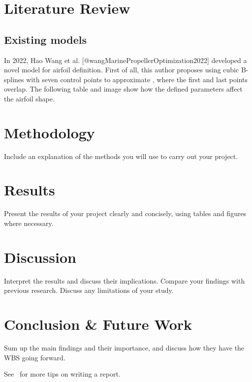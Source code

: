 \documentclass[11pt,twoside,a4paper]{report}
\begin{document}
\chapter{Literature Review}
\section{Existing models}
In 2022, Hao Wang et al. [@wangMarinePropellerOptimization2022] developed a novel model for airfoil definition. First of all, this author proposes using cubic B-splines with seven control points to approximate , where the first and last points overlap. The following table and image show how the defined parameters affect the airfoil shape.

\chapter{Methodology}
Include an explanation of the methods you will use to carry out your project.
\chapter{Results}
Present the results of your project clearly and concisely, using tables and figures where necessary.
\chapter{Discussion}
Interpret the results and discuss their implications.
Compare your findings with previous research.
Discuss any limitations of your study.
\chapter{Conclusion \& Future Work}
Sum up the main findings and their importance, and discuss how they have the WBS going forward.

See~\cite{Joshua2012} for more tips on writing a report.




\end{document}

